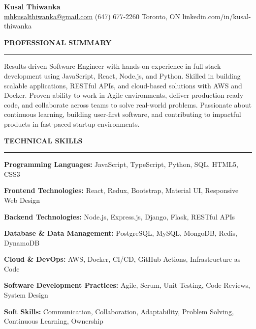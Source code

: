 \documentclass[10pt,letterpaper]{article}
\begin{document}
\begin{center}
{\LARGE\textbf{Kusal Thiwanka}}\\[3pt]
\href{mailto:mhkusalthiwanka@gmail.com}{mhkusalthiwanka@gmail.com}\hspace{2em}%
(647) 677{-}2260\hspace{2em}%
Toronto, ON\hspace{2em}
linkedin.com/in/kusal-thiwanka
\end{center}

\vspace{6pt}

\textbf{PROFESSIONAL SUMMARY}\\[-8pt]
\noindent\rule{\textwidth}{1pt}

\vspace{-2pt}

Results-driven Software Engineer with hands-on experience in full stack development using JavaScript, React, Node.js, and Python. Skilled in building scalable applications, RESTful APIs, and cloud-based solutions with AWS and Docker. Proven ability to work in Agile environments, deliver production-ready code, and collaborate across teams to solve real-world problems. Passionate about continuous learning, building user-first software, and contributing to impactful products in fast-paced startup environments.

\vspace{8pt}

\textbf{TECHNICAL SKILLS}\\[-8pt]
\noindent\rule{\textwidth}{1pt}

\vspace{-2pt}

\textbf{Programming Languages:} JavaScript, TypeScript, Python, SQL, HTML5, CSS3

\textbf{Frontend Technologies:} React, Redux, Bootstrap, Material UI, Responsive Web Design

\textbf{Backend Technologies:} Node.js, Express.js, Django, Flask, RESTful APIs

\textbf{Database \& Data Management:} PostgreSQL, MySQL, MongoDB, Redis, DynamoDB

\textbf{Cloud \& DevOps:} AWS, Docker, CI/CD, GitHub Actions, Infrastructure as Code

\textbf{Software Development Practices:} Agile, Scrum, Unit Testing, Code Reviews, System Design

\textbf{Soft Skills:} Communication, Collaboration, Adaptability, Problem Solving, Continuous Learning, Ownership
\end{document}
